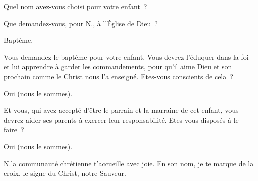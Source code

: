 
Quel nom avez-vous choisi pour votre enfant~?


 Que demandez-vous, pour {\color{red}N.}, à l'Église de Dieu~?

 Baptême.

 Vous demandez le baptême pour votre enfant.
Vous devrez l’éduquer dans la foi et lui apprendre à garder les
commandements, pour qu’il aime Dieu et son prochain comme le Christ
nous l’a enseigné. Etes-vous conscients de cela~?

 Oui (nous le sommes).

Et vous, qui avez accepté d’être le parrain et la marraine de cet enfant,
vous devrez aider ses parents à exercer leur responsabilité. Etes-vous
disposés à le faire~?

 Oui (nous le sommes).

 {\color{red}N.}la communauté chrétienne t’accueille
avec joie. En son nom, je te marque de la croix, le signe du Christ,
notre Sauveur.

